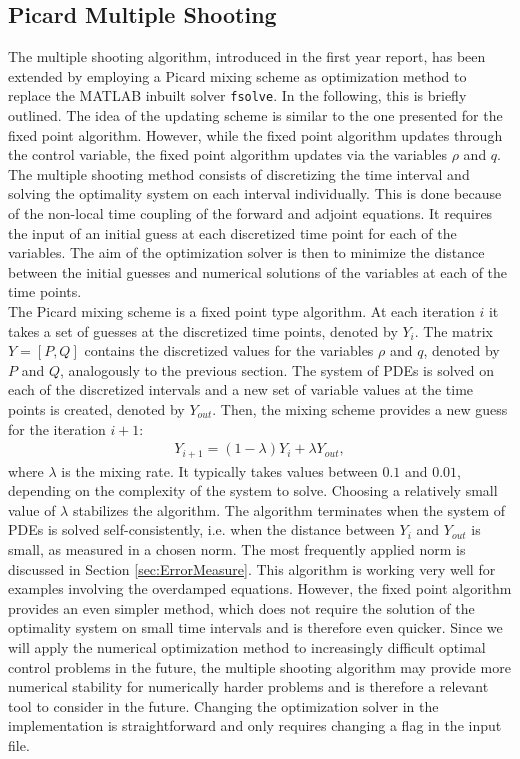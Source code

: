 \documentclass[11pt, a4paper]{article}
\theoremstyle{definition}
\begin{document}
\subsection{Picard Multiple Shooting}

The multiple shooting algorithm, introduced in the first year report, has been extended by employing a Picard mixing scheme as optimization method to replace the {\scshape MATLAB} inbuilt solver \texttt{fsolve}. In the following, this is briefly outlined.
The idea of the updating scheme is similar to the one presented for the fixed point algorithm. However, while the fixed point algorithm updates through the control variable, the fixed point algorithm updates via the variables $\rho$ and $q$.
The multiple shooting method consists of discretizing the time interval and solving the optimality system on each interval individually. This is done because of the non-local time coupling of the forward and adjoint equations. It requires the input of an initial guess at each discretized time point for each of the variables. The aim of the optimization solver is then to minimize the distance between the initial guesses and numerical solutions of the variables at each of the time points. \\
The Picard mixing scheme is a fixed point type algorithm. At each iteration $i$ it takes a set of guesses at the discretized time points, denoted by $Y_i$. The matrix $Y = [P,Q]$ contains the discretized values for the variables $\rho$ and $q$, denoted by $P$ and $Q$, analogously to the previous section.  
The system of PDEs is solved on each of the discretized intervals and a new set of variable values at the time points is created, denoted by $Y_{out}$. Then, the mixing scheme provides a new guess for the iteration $i+1$:
\begin{align*}
Y_{i+1} = (1 - \lambda)Y_i + \lambda Y_{out},
\end{align*}
where $\lambda$ is the mixing rate. It typically takes values between $0.1$ and $0.01$, depending on the complexity of the system to solve. Choosing a relatively small value of $\lambda$ stabilizes the algorithm. 
The algorithm terminates when the system of PDEs is solved self-consistently, i.e. when the distance between $Y_i$ and $Y_{out}$ is small, as measured in a chosen norm. The most frequently applied norm is discussed in Section \ref{sec:ErrorMeasure}.
This algorithm is working very well for examples involving the overdamped equations. However, the fixed point algorithm provides an even simpler method, which does not require the solution of the optimality system on small time intervals and is therefore even quicker. Since we will apply the numerical optimization method to increasingly difficult optimal control problems in the future, the multiple shooting algorithm may provide more numerical stability for numerically harder problems and is therefore a relevant tool to consider in the future. Changing the optimization solver in the implementation is straightforward and only requires changing a flag in the input file.
\end{document}
